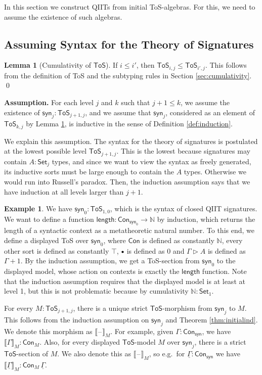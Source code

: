 \documentclass{article}
\theoremstyle{definition}
\newtheorem{example}{Example}
\theoremstyle{theorem}
\newtheorem{lemma}{Lemma}
\newcommand{\Con}{\mathsf{Con}}
\newcommand{\blank}{\mathord{\hspace{1pt}\text{--}\hspace{1pt}}}
\newcommand{\ra}{\rightarrow}
\newcommand{\Set}{\mathsf{Set}}
\newcommand{\ToS}{\mathsf{ToS}}
\newcommand{\ext}{\triangleright}
\newcommand{\emptycon}{\scaleobj{.75}\bullet}
\newcommand{\syn}{\mathsf{syn}}
\newcommand{\ul}[1]{\underline{#1}}
\newcommand{\ulGamma}{\ul{\Gamma}}
\begin{document}
In this section we construct QIITs from initial ToS-algebras. For this, we need
to assume the existence of such algebras.

\subsection{Assuming Syntax for the Theory of Signatures}

\begin{lemma}[Cumulativity of $\ToS$]\label{lemma:cumulativity}
If $i \leq i'$, then $\ToS_{i,j} \leq \ToS_{i', j}$.  This follows from the
definition of ToS and the subtyping rules in Section
\ref{sec:cumulativity}. \qed
\end{lemma}

\textbf{Assumption.} For each level $j$ and $k$ such that $j+1 \leq k$, we
assume the existence of $\syn_j : \ToS_{j+1,j}$, and we assume that $\syn_j$,
considered as an element of $\ToS_{k,j}$ by Lemma \ref{lemma:cumulativity}, is
inductive in the sense of Definition \ref{def:induction}.

We explain this assumption. The syntax for the theory of signatures is
postulated at the lowest possible level $\ToS_{j+1,j}$. This is the lowest
because signatures may contain $A : \Set_j$ types, and since we want to view the
syntax as freely generated, its inductive sorts must be large enough to contain
the $A$ types. Otherwise we would run into Russell's paradox. Then, the
induction assumption says that we have induction at all levels larger than
$j+1$.

\begin{example}
We have $\syn_0 : \ToS_{1, 0}$, which is the syntax of closed QIIT
signatures. We want to define a function $\mathsf{length} : \Con_{\syn_0} \ra
\mathbb{N}$ by induction, which returns the length of a syntactic context as a
metatheoretic natural number. To this end, we define a displayed ToS over
$\syn_0$, where $\Con$ is defined as constantly $\mathbb{N}$, every other sort
is defined as constantly $\top$, $\emptycon$ is defined as $0$ and $\Gamma\ext
A$ is defined as $\Gamma + 1$. By the induction assumption, we get a ToS-section
from $\syn_0$ to the displayed model, whose action on contexts is exactly the
$\mathsf{length}$ function. Note that the induction assumption requires that the
displayed model is at least at level 1, but this is not problematic because by
cumulativity $\mathbb{N} : \Set_1$.
\end{example}

For every $M : \ToS_{j+1,j}$, there is a unique strict $\ToS$-morphism from
$\syn_j$ to $M$. This follows from the induction assumption on $\syn_j$ and
Theorem \ref{thm:initialind}. We denote this morphism as
$\llbracket\blank\rrbracket_M$.  For example, given $\Gamma : \Con_\syn$, we
have $\llbracket\Gamma\rrbracket_M : \Con_M$.  Also, for every displayed
$\ToS$-model $M$ over $\syn_j$, there is a strict $\ToS$-section of $M$. We also
denote this as $\llbracket\blank\rrbracket_M$, so e.g.\ for $\ulGamma :
\Con_\syn$ we have $\llbracket\ulGamma\rrbracket_M : \Con_M\,\ulGamma$.
\end{document}

